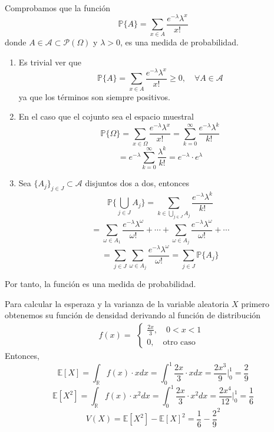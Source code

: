 \begin{ejr}
  Comprobamos que la función
  \[ 
    \mathbb{P} \{ A \} = \sum_{x \in A} \frac{e^{-\lambda} \lambda^{x}}{x!} 
  \] 
  donde $A \in \mathcal{A} \subset \mathcal{P}(\Omega)$ y $\lambda > 0$, es una medida de probabilidad. 
  \begin{enumerate}[label=(\roman*)]
    \item Es trivial ver que 
      \[ 
        \mathbb{P} \{ A \} = \sum_{x \in A} \frac{e^{-\lambda} \lambda^{x}}{x!} \geq 0, \quad \forall A \in \mathcal{A}
      \] 
      ya que los términos son siempre positivos.
    \item En el caso que el cojunto sea el espacio muestral
      \[ 
        \mathbb{P} \{ \Omega \} = \sum_{x \in \Omega} \frac{e^{-\lambda} \lambda^{x}}{x!} = \sum_{k = 0}^{\infty} \frac{e^{-\lambda} \lambda^{k}}{k!}
      \] 
      \[ 
        = e^{-\lambda} \sum_{k = 0}^{\infty} \frac{\lambda^{k}}{k!} = e^{-\lambda} \cdot e^{\lambda}
      \] 
    \item Sea $\{ A_{j} \}_{j \in J} \subset \mathcal{A}$ disjuntos dos a dos, entonces
      \[ 
        \mathbb{P} \{ \bigcup_{j \in J} A_{j} \} = \sum_{k \in \bigcup_{j \in J} A_{j}} \frac{e^{-\lambda} \lambda^{k}}{k!}
      \] 
      \[ 
        = \sum_{\omega \in A_{1}} \frac{e^{-\lambda} \lambda^{\omega}}{\omega!} + \cdots + \sum_{\omega \in A_{j}} \frac{e^{-\lambda} \lambda^{\omega}}{\omega!} + \cdots
      \] 
      \[ 
        = \sum_{j \in J} \sum_{\omega \in A_{j}} \frac{e^{-\lambda} \lambda^{\omega}}{\omega!} = \sum_{j \in J} \mathbb{P} \{ A_{j} \} 
      \] 
  \end{enumerate}
  Por tanto, la función es una medida de probabilidad.
\end{ejr}

\begin{ejr}
  Para calcular la esperaza y la varianza de la variable aleatoria $X$ primero obtenemos su función de densidad derivando al función de distribución
  \[ 
    f(x) =
    \begin{aligned}
      \begin{cases}
        \frac{2x}{3}, \quad 0 < x < 1 \\
        0, \quad \text{otro caso}
      \end{cases}
    \end{aligned} 
  \] 
  Entonces,
  \[ 
    \mathbb{E} [ X ] = \int_{\mathbb{R}} f(x) \cdot x dx = \int_{0}^{1} \frac{2x}{3} \cdot x dx = \frac{2x^{3}}{9} \Big |_{0}^{1} = \frac{2}{9}
  \] 
  \[ 
    \mathbb{E} [ X^{2} ] = \int_{\mathbb{R}} f(x) \cdot x^{2} dx = \int_{0}^{1} \frac{2x}{3} \cdot x^{2} dx = \frac{2x^{4}}{12} \Big |_{0}^{1} = \frac{1}{6}
  \] 
  \[ 
    V(X) = \mathbb{E} [ X^{2} ] - \mathbb{E} [ X ]^{2} = \frac{1}{6} - \frac{2}{9}^{2} 
  \] 
\end{ejr}

